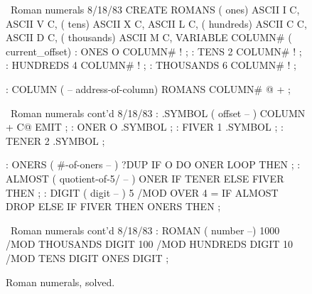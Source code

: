 \begin{figure*}[tttt]
\caption{Roman numerals, solved.}
\vspace{1ex}
\setcounter{screen}{20}
\begin{Screen}
\ Roman numerals                                         8/18/83
CREATE ROMANS    ( ones)  ASCII I  C,   ASCII V  C,
                 ( tens)  ASCII X  C,   ASCII L  C,
             ( hundreds)  ASCII C  C,   ASCII D  C,
            ( thousands)  ASCII M  C,
VARIABLE COLUMN#  ( current_offset)
: ONES       O COLUMN# ! ;
: TENS       2 COLUMN# ! ;
: HUNDREDS   4 COLUMN# ! ;
: THOUSANDS  6 COLUMN# ! ;

: COLUMN ( -- address-of-column)  ROMANS  COLUMN# @  + ;

\end{Screen}

\begin{Screen}
\ Roman numerals cont'd                                  8/18/83
: .SYMBOL  ( offset -- )  COLUMN +  C@ EMIT ;
: ONER    O .SYMBOL ;
: FIVER   1 .SYMBOL ;
: TENER   2 .SYMBOL ;

: ONERS  ( #-of-oners -- )
   ?DUP  IF  O DO  ONER  LOOP  THEN ;
: ALMOST  ( quotient-of-5/ -- )
   ONER  IF  TENER  ELSE  FIVER  THEN ;
: DIGIT  ( digit -- )
   5 /MOD  OVER  4 = IF  ALMOST  DROP  ELSE  IF FIVER THEN
   ONERS THEN ;

\end{Screen}

\begin{Screen}
\ Roman numerals cont'd                                  8/18/83
: ROMAN  ( number --)  1000 /MOD  THOUSANDS DIGIT
                        100 /MOD   HUNDREDS DIGIT
                         10 /MOD       TENS DIGIT
                                       ONES DIGIT  ;

\end{Screen}
\vspace{1ex}
\label{fig-fig4-9}
\end{figure*}%
%


